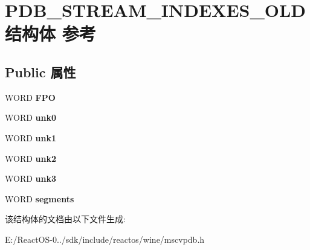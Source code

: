 \hypertarget{struct_p_d_b___s_t_r_e_a_m___i_n_d_e_x_e_s___o_l_d}{}\section{P\+D\+B\+\_\+\+S\+T\+R\+E\+A\+M\+\_\+\+I\+N\+D\+E\+X\+E\+S\+\_\+\+O\+L\+D结构体 参考}
\label{struct_p_d_b___s_t_r_e_a_m___i_n_d_e_x_e_s___o_l_d}
\subsection*{Public 属性}
\begin{DoxyCompactItemize}
\item 
\mbox{\label{struct_p_d_b___s_t_r_e_a_m___i_n_d_e_x_e_s___o_l_d_a8b01953d8cc853342284560ad29623ab}} 
W\+O\+RD {\bfseries F\+PO}
\item 
\mbox{\label{struct_p_d_b___s_t_r_e_a_m___i_n_d_e_x_e_s___o_l_d_ad367233d296a294a39991699886001bf}} 
W\+O\+RD {\bfseries unk0}
\item 
\mbox{\label{struct_p_d_b___s_t_r_e_a_m___i_n_d_e_x_e_s___o_l_d_ae19ee686712dc4e0c70cbb92ae7ba25d}} 
W\+O\+RD {\bfseries unk1}
\item 
\mbox{\label{struct_p_d_b___s_t_r_e_a_m___i_n_d_e_x_e_s___o_l_d_ad828e383dc93e3bc1462360c5364890e}} 
W\+O\+RD {\bfseries unk2}
\item 
\mbox{\label{struct_p_d_b___s_t_r_e_a_m___i_n_d_e_x_e_s___o_l_d_a3b4cfc3499809e23a801205c28d1c55f}} 
W\+O\+RD {\bfseries unk3}
\item 
\mbox{\label{struct_p_d_b___s_t_r_e_a_m___i_n_d_e_x_e_s___o_l_d_a79a95df24130feba1c65f5fc76214afc}} 
W\+O\+RD {\bfseries segments}
\end{DoxyCompactItemize}


该结构体的文档由以下文件生成\+:\begin{DoxyCompactItemize}
\item 
E\+:/\+React\+O\+S-\/0../sdk/include/reactos/wine/mscvpdb.\+h\end{DoxyCompactItemize}

